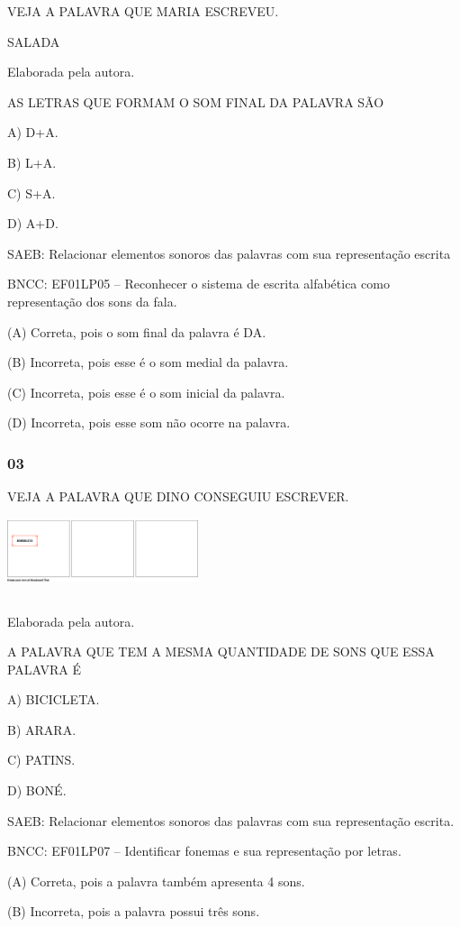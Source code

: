 VEJA A PALAVRA QUE MARIA ESCREVEU.

SALADA

Elaborada pela autora.

AS LETRAS QUE FORMAM O SOM FINAL DA PALAVRA SÃO

A) D+A.

B) L+A.

C) S+A.

D) A+D.

SAEB: Relacionar elementos sonoros das palavras com sua representação escrita

BNCC: EF01LP05 -- Reconhecer o sistema de escrita alfabética como representação
dos sons da fala.

(A) Correta, pois o som final da palavra  é DA.

(B) Incorreta, pois esse é o som medial da palavra.

(C) Incorreta, pois esse é o som inicial da palavra.

(D) Incorreta, pois esse som não ocorre na palavra.\protect\hypertarget{_heading=h.ebpkik53igmj}{}{}

\subsubsection{03}\label{section-75}

VEJA A PALAVRA QUE DINO CONSEGUIU
ESCREVER.\includegraphics[width=2.21250in,height=1.04375in]{media/image243.png}

Elaborada pela autora.

A PALAVRA QUE TEM A MESMA QUANTIDADE DE SONS QUE ESSA PALAVRA É

A) BICICLETA.

B) ARARA.

C) PATINS.

D) BONÉ.

SAEB: Relacionar elementos sonoros das palavras com sua representação escrita.

BNCC: EF01LP07 -- Identificar fonemas e sua representação por letras.

(A) Correta, pois a palavra também apresenta 4 sons.

(B) Incorreta, pois a palavra possui três sons.

